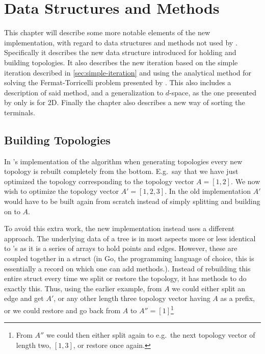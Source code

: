  {
\abnormalparskip{0pt}
\chapter{Data Structures and Methods}
\label{cha:data-structures}
}

This chapter will describe some more notable elements of the new implementation,
with regard to data structures and methods not used by
\textcite{smith1992}. Specifically it describes the new data structure
introduced for holding and building topologies. It also describes the new
iteration based on the simple iteration described in \cref{sec:simple-iteration}
and using the analytical method for solving the Fermat-Torricelli problem
presented by \textcite{uteshev2014}. This also includes a description of said
method, and a generalization to $d$-space, as the one presented by
\textcite{uteshev2014} only is for 2D. Finally the chapter also describes a new
way of sorting the terminals.

\section{Building Topologies}
\label{sec:building-topologies}

In \citeauthor{smith1992}'s implementation of the algorithm when generating
topologies every new topology is rebuilt completely from the bottom. E.g.\ say
that we have just optimized the topology corresponding to the topology vector
$A = [1, 2]$. We now wish to optimize the topology vector
$A' = [1, 2, 3]$. In the old implementation $A'$ would have to be built again
from scratch instead of simply splitting and building on to $A$.

To avoid this extra work, the new implementation instead uses a different
approach. The underlying data of a tree is in most aspects more or less
identical to \citeauthor{smith1992}'s as it is a series of arrays to hold points
and edges. However, these are coupled together in a struct (in Go, the
programming language of choice, this is essentially a record on which one can add
methods.). Instead of rebuilding this entire struct every time we split or
restore the topology, it has methods to do exactly this. Thus, using the earlier
example, from $A$ we could either split an
edge and get $A'$, or any other length three topology vector having $A$ as a
prefix, or we could restore and go back from $A$ to $A'' = [1]$\footnote{From
  $A''$ we could then either split again to e.g.\ the next topology vector of
  length two, $[1, 3]$, or restore once again.}

